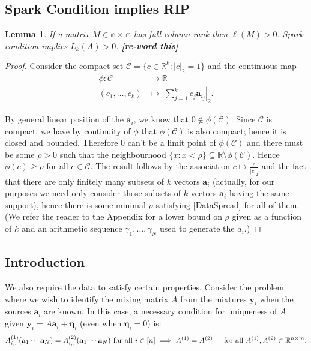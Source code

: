 \documentclass[journal, onecolumn]{IEEEtran}
\newtheorem{lemma}{Lemma}
\begin{document}
\subsection{Spark Condition implies RIP}

\begin{lemma}
If a matrix $M \in \mathbb{n \times m}$ has full column rank then $\ell(M) > 0$. Spark condition implies $L_k(A) > 0$. \textbf{[re-word this]}
\end{lemma}

\begin{proof}
Consider the compact set $\mathcal{C} = \{c \in \mathbb{R}^k: |c|_2 = 1\}$ and the continuous map
\begin{align*}
\phi: \mathcal{C} &\to \mathbb{R} \\
(c_1, \ldots, c_k) &\mapsto |\sum_{j = 1}^k c_j \mathbf{a}_{i_j}|_2.
\end{align*}

By general linear position of the $\mathbf{a}_i$, we know that $0 \notin \phi(\mathcal{C})$. Since $\mathcal{C}$ is compact, we have by continuity of $\phi$ that $\phi(\mathcal{C})$ is also compact; hence it is closed and bounded. Therefore $0$ can't be a limit point of $\phi(\mathcal{C})$ and there must be some $\rho > 0$ such that the neighbourhood $\{x: x < \rho\} \subseteq \mathbb{R} \setminus \phi(\mathcal{C})$. Hence $\phi(c) \geq \rho$ for all $c \in \mathcal{C}$. The result follows by the association $c \mapsto \frac{c}{|c|_2}$ and the fact that there are only finitely many subsets of $k$ vectors $\mathbf{a}_i$ (actually, for our purposes we need only consider those subsets of $k$ vectors $\mathbf{a}_i$ having the same support), hence there is some minimal $\rho$ satisfying \eqref{DataSpread} for all of them. (We refer the reader to the Appendix for a lower bound on $\rho$ given as a function of $k$ and an arithmetic sequence $\gamma_1, \ldots, \gamma_N$ used to generate the $a_i$.)
\end{proof}


      
\subsection{Introduction}

We also require the data to satisfy certain properties. Consider the problem where we wish to identify the mixing matrix $A$ from the mixtures $\mathbf{y}_i$ when the sources $\mathbf{a}_i$ are known. In this case, a necessary condition for uniqueness of $A$ given $\mathbf{y}_i = A \mathbf{a}_i + \mathbf{\eta}_i$ (even when $\mathbf{\eta}_i=0$) is:
\begin{align}\label{SparkCondition2}
A^{(1)}_{i,:}(\mathbf{a}_1 \cdots \mathbf{a}_N) = A^{(2)}_{i,:}(\mathbf{a}_1 \cdots \mathbf{a}_N)  \text{ for all } i \in [n] \implies A^{(1)}  = A^{(2)} \indent \text{for all } A^{(1)}, A^{(2)} \in \mathbb{R}^{n \times m}.
\end{align}
\end{document}
